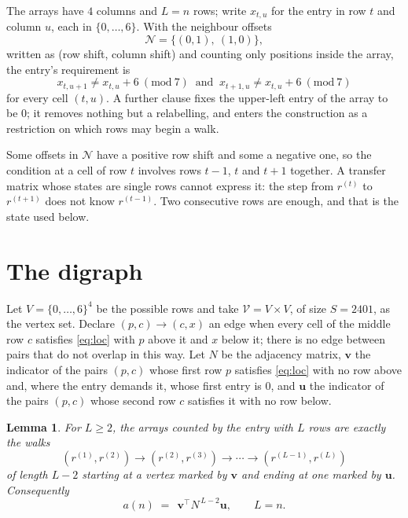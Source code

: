 \documentclass[11pt,a4paper]{article}
\theoremstyle{plain}
\newtheorem{lemma}[theorem]{Lemma}
\theoremstyle{definition}
\begin{document}
The arrays have $4$ columns and $L=n$ rows; write $x_{t,u}$ for the entry in
row $t$ and column $u$, each in $\{0,\dots,6\}$. With the neighbour offsets
\[
\mathcal N=\{(0,1),\ (1,0)\},
\]
written as (row shift, column shift) and counting only positions inside the array, the
entry's requirement is
\begin{equation}\label{eq:loc}
x_{t,u+1}\ne x_{t,u}+6\ (\mathrm{mod}\ 7)\ \text{ and }\ x_{t+1,u}\ne x_{t,u}+6\ (\mathrm{mod}\ 7)
\end{equation}
for every cell $(t,u)$. A further clause fixes the upper-left entry of the array to be $0$; it removes nothing but a relabelling, and enters the construction as a restriction on which rows may begin a walk.

Some offsets in $\mathcal N$ have a positive row shift and some a negative one, so the
condition at a cell of row $t$ involves rows $t-1$, $t$ and $t+1$ together. A transfer
matrix whose states are single rows cannot express it: the step from $r^{(t)}$ to
$r^{(t+1)}$ does not know $r^{(t-1)}$. Two consecutive rows are enough, and that is
the state used below.

\section{The digraph}

Let $V=\{0,\dots,6\}^{4}$ be the possible rows and take
$\mathcal V=V\times V$, of size $S=2401$, as the vertex set. Declare $(p,c)\to(c,x)$ an edge
when every cell of the middle row $c$ satisfies \eqref{eq:loc} with $p$ above it and $x$
below it; there is no edge between pairs that do not overlap in this way. Let $N$ be the
adjacency matrix, $\mathbf{v}$ the indicator of the pairs $(p,c)$ whose first row $p$
satisfies \eqref{eq:loc} with no row above and, where the entry demands it, whose first entry is $0$, and $\mathbf{u}$ the indicator of
the pairs $(p,c)$ whose second row $c$ satisfies it with no row below.

\begin{lemma}\label{lem:walk}
For $L\ge2$, the arrays counted by the entry with $L$ rows are exactly the walks
\[
(r^{(1)},r^{(2)})\to(r^{(2)},r^{(3)})\to\cdots\to(r^{(L-1)},r^{(L)})
\]
of length $L-2$ starting at a vertex marked by $\mathbf{v}$ and ending at one marked by
$\mathbf{u}$. Consequently
\[
a(n)\;=\;\,\mathbf{v}^{\!\top}N^{\,L-2}\mathbf{u},\qquad L=n .
\]
\end{lemma}
\end{document}
